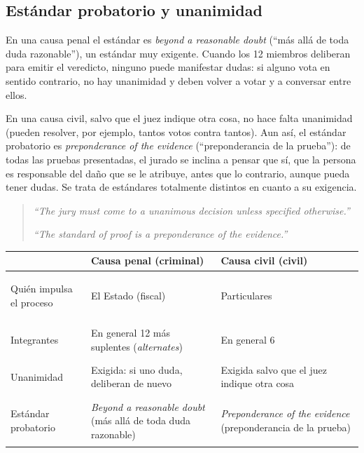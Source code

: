 \documentclass[12pt,oneside]{book}
\begin{document}
\subsection{Estándar probatorio y unanimidad}

En una causa penal el estándar es \textit{beyond a reasonable doubt} (``más allá de toda duda razonable''), un estándar muy exigente. Cuando los 12 miembros deliberan para emitir el veredicto, ninguno puede manifestar dudas: si alguno vota en sentido contrario, no hay unanimidad y deben volver a votar y a conversar entre ellos.

En una causa civil, salvo que el juez indique otra cosa, no hace falta unanimidad (pueden resolver, por ejemplo, tantos votos contra tantos). Aun así, el estándar probatorio es \textit{preponderance of the evidence} (``preponderancia de la prueba''): de todas las pruebas presentadas, el jurado se inclina a pensar que sí, que la persona es responsable del daño que se le atribuye, antes que lo contrario, aunque pueda tener dudas. Se trata de estándares totalmente distintos en cuanto a su exigencia.

\begin{quote}
\textit{``The jury must come to a unanimous decision unless specified otherwise.''}

\textit{``The standard of proof is a preponderance of the evidence.''}
\end{quote}

\begin{table}[H]
\centering
\small
\renewcommand{\arraystretch}{1.25}
\begin{tabularx}{\textwidth}{@{}>{\bfseries\raggedright\arraybackslash}p{}YY@{}}
\toprule
 & \textbf{Causa penal (criminal)} & \textbf{Causa civil (civil)} \\
\midrule
Quién impulsa el proceso & El Estado (fiscal) & Particulares \\
Integrantes & En general 12 más suplentes (\textit{alternates}) & En general 6 \\
Unanimidad & Exigida: si uno duda, deliberan de nuevo & Exigida salvo que el juez indique otra cosa \\
Estándar probatorio & \textit{Beyond a reasonable doubt} (más allá de toda duda razonable) & \textit{Preponderance of the evidence} (preponderancia de la prueba) \\
\bottomrule
\end{tabularx}
\end{table}
\end{document}
